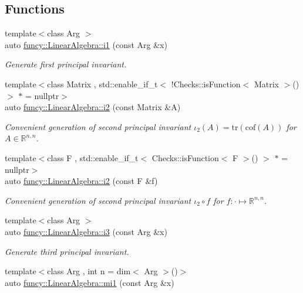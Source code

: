 \subsection*{Functions}
\begin{DoxyCompactItemize}
\item 
{\footnotesize template$<$class Arg $>$ }\\auto \hyperlink{group__InvariantGroup_ga84b31b28660514e241f649d3c6f93a7c}{funcy\-::\-Linear\-Algebra\-::i1} (const Arg \&x)
\begin{DoxyCompactList}\small\item\em Generate first principal invariant. \end{DoxyCompactList}\item 
{\footnotesize template$<$class Matrix , std\-::enable\-\_\-if\-\_\-t$<$ !\-Checks\-::is\-Function$<$ Matrix $>$() $>$ $\ast$  = nullptr$>$ }\\auto \hyperlink{group__InvariantGroup_ga1d46274d7b5b03321f8136c6b11bf473}{funcy\-::\-Linear\-Algebra\-::i2} (const Matrix \&A)
\begin{DoxyCompactList}\small\item\em Convenient generation of second principal invariant $ \iota_2(A)=\mathrm{tr}(\mathrm{cof}(A)) $ for $A\in\mathbb{R}^{n,n}$. \end{DoxyCompactList}\item 
{\footnotesize template$<$class F , std\-::enable\-\_\-if\-\_\-t$<$ Checks\-::is\-Function$<$ F $>$() $>$ $\ast$  = nullptr$>$ }\\auto \hyperlink{group__InvariantGroup_gaa9c14aef534cb03abd7c84b2ce36415d}{funcy\-::\-Linear\-Algebra\-::i2} (const F \&f)
\begin{DoxyCompactList}\small\item\em Convenient generation of second principal invariant $ \iota_2\circ f $ for $f:\cdot\mapsto\mathbb{R}^{n,n}$. \end{DoxyCompactList}\item 
{\footnotesize template$<$class Arg $>$ }\\auto \hyperlink{group__InvariantGroup_gab549eecd5d41cabdf6ad9d5fd5ef1207}{funcy\-::\-Linear\-Algebra\-::i3} (const Arg \&x)
\begin{DoxyCompactList}\small\item\em Generate third principal invariant. \end{DoxyCompactList}\item 
{\footnotesize template$<$class Arg , int n = dim$<$ Arg $>$()$>$ }\\auto \hyperlink{group__InvariantGroup_ga22a3d609bf5ccffa5c8c8c25c570ace6}{funcy\-::\-Linear\-Algebra\-::mi1} (const Arg \&x)

\end{DoxyCompactItemize}
